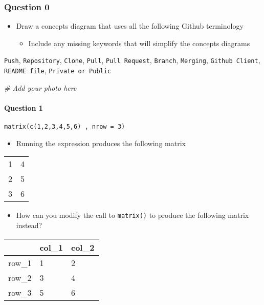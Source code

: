 \documentclass[
]{article}
\author{}
\date{\vspace{-2.5em}}
\newenvironment{Shaded}{\begin{snugshade}}{\end{snugshade}}
\newcommand{\CommentTok}[1]{\textcolor[rgb]{0.56,0.35,0.01}{\textit{#1}}}
\providecommand{\tightlist}{%
  \setlength{\itemsep}{0pt}\setlength{\parskip}{0pt}}
\begin{document}
\hypertarget{question-0}{%
\subsubsection{Question 0}\label{question-0}}

\begin{itemize}
\tightlist
\item
  Draw a concepts diagram that uses all the following Github terminology

  \begin{itemize}
  \tightlist
  \item
    Include any missing keywords that will simplify the concepts
    diagrams
  \end{itemize}
\end{itemize}

\texttt{Push}, \texttt{Repository}, \texttt{Clone}, \texttt{Pull},
\texttt{Pull\ Request}, \texttt{Branch}, \texttt{Merging},
\texttt{Github\ Client}, \texttt{README\ file},
\texttt{Private\ or\ Public}

\begin{Shaded}
\begin{Highlighting}[]
\CommentTok{# Add your photo here}
\end{Highlighting}
\end{Shaded}

\hypertarget{question-1}{%
\paragraph{Question 1}\label{question-1}}

\texttt{matrix(c(1,2,3,4,5,6)\ ,\ nrow\ =\ 3)}

\begin{itemize}
\tightlist
\item
  Running the expression produces the following matrix
\end{itemize}

\begin{longtable}[]{@{}ll@{}}
\toprule
\endhead
1 & 4\tabularnewline
2 & 5\tabularnewline
3 & 6\tabularnewline
\bottomrule
\end{longtable}

\begin{itemize}
\tightlist
\item
  How can you modify the call to \texttt{matrix()} to produce the
  following matrix instead?
\end{itemize}

\begin{longtable}[]{@{}lll@{}}
\toprule
& col\_1 & col\_2\tabularnewline
\midrule
\endhead
row\_1 & 1 & 2\tabularnewline
row\_2 & 3 & 4\tabularnewline
row\_3 & 5 & 6\tabularnewline
\bottomrule
\end{longtable}
\end{document}
